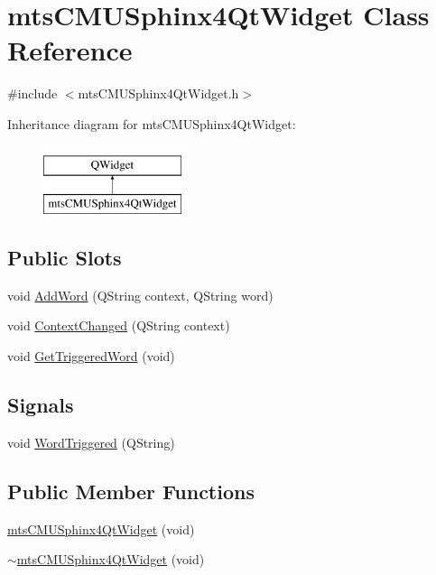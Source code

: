 \hypertarget{classmts_c_m_u_sphinx4_qt_widget}{}\section{mts\+C\+M\+U\+Sphinx4\+Qt\+Widget Class Reference}
\label{classmts_c_m_u_sphinx4_qt_widget}


{\ttfamily \#include $<$mts\+C\+M\+U\+Sphinx4\+Qt\+Widget.\+h$>$}

Inheritance diagram for mts\+C\+M\+U\+Sphinx4\+Qt\+Widget\+:\begin{figure}[H]
\begin{center}
\leavevmode
\includegraphics[height=2.000000cm]{d8/d9d/classmts_c_m_u_sphinx4_qt_widget}
\end{center}
\end{figure}
\subsection*{Public Slots}
\begin{DoxyCompactItemize}
\item 
void \hyperlink{classmts_c_m_u_sphinx4_qt_widget_ae3c3373c0fa186d55a40a9f8c97a29b5}{Add\+Word} (Q\+String context, Q\+String word)
\item 
void \hyperlink{classmts_c_m_u_sphinx4_qt_widget_a33698dc08fa2e3ed63a872fc91a626eb}{Context\+Changed} (Q\+String context)
\item 
void \hyperlink{classmts_c_m_u_sphinx4_qt_widget_adad1191cef15d968e9f3195f8a864f01}{Get\+Triggered\+Word} (void)
\end{DoxyCompactItemize}
\subsection*{Signals}
\begin{DoxyCompactItemize}
\item 
void \hyperlink{classmts_c_m_u_sphinx4_qt_widget_a19864aefc0dab3cfcc1652491ead2ea2}{Word\+Triggered} (Q\+String)
\end{DoxyCompactItemize}
\subsection*{Public Member Functions}
\begin{DoxyCompactItemize}
\item 
\hyperlink{classmts_c_m_u_sphinx4_qt_widget_a2c1f05163a739c9d1e2a952878bb83bd}{mts\+C\+M\+U\+Sphinx4\+Qt\+Widget} (void)
\item 
\hyperlink{classmts_c_m_u_sphinx4_qt_widget_aec927ff8f062a0e8daf26a931e9e4899}{$\sim$mts\+C\+M\+U\+Sphinx4\+Qt\+Widget} (void)
\end{DoxyCompactItemize}
